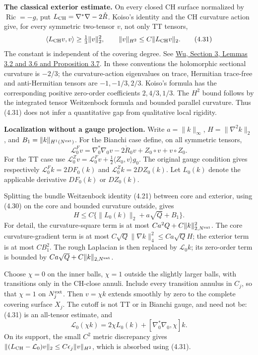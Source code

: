 \documentclass[
  11pt,
]{article}
\begin{document}
\textbf{The classical exterior estimate.} On every closed CH surface
normalized by \(\operatorname{Ric}=-g\), put
\(L_{\rm CH}=\nabla^*\nabla-2\mathring R\). Koiso's identity and the CH
curvature action give, for every symmetric two-tensor \(v\), not only TT
tensors, \[
 \langle L_{\rm CH}v,v\rangle\ge\tfrac13\|v\|_2^2,\qquad
 \|v\|_{H^2}\le C\|L_{\rm CH}v\|_2. \tag{4.31}
\] The constant is independent of the covering degree. See
\href{https://arxiv.org/abs/1106.0511}{Wu, Section 3, Lemmas 3.2 and 3.6
and Proposition 3.7}. In these conventions the holomorphic sectional
curvature is \(-2/3\); the curvature-action eigenvalues on trace,
Hermitian trace-free and anti-Hermitian tensors are \(-1,-1/3,2/3\).
Koiso's formula has the corresponding positive zero-order coefficients
\(2,4/3,1/3\). The \(H^2\) bound follows by the integrated tensor
Weitzenbock formula and bounded parallel curvature. Thus (4.31) does not
infer a quantitative gap from qualitative local rigidity.

\textbf{Localization without a gauge projection.} Write
\(a=\|k\|_\infty\), \(H=\|\nabla^2k\|_2\), and
\(B_1=\|k\|_{H^1(N^{\rm ext})}\). For the Bianchi case define, on all
symmetric tensors, \[
 \mathcal L_0^F v=\nabla_0^*\nabla_0v
          -2\mathring R_0v+Z_0\circ v+v\circ Z_0.
\] For the TT case use
\(\mathcal L_0^Z v=\mathcal L_0^Fv+ \frac12\langle Z_0,v\rangle g_0\).
The original gauge condition gives respectively
\(\mathcal L_0^Fk=2DF_0(k)\) and \(\mathcal L_0^Zk=2DZ_0(k)\). Let
\(L_0(k)\) denote the applicable derivative \(DF_0(k)\) or \(DZ_0(k)\).

Splitting the bundle Weitzenbock identity (4.21) between core and
exterior, using (4.30) on the core and bounded curvature outside, gives
\[
 H\le C\{\|L_0(k)\|_2+a\sqrt Q+B_1\}. \tag{4.32}
\] For detail, the curvature-square term is at most
\(Ca^2Q+C\|k\|_{2,N^{\rm ext}}^2\). The core curvature-gradient term is
at most \(C\sqrt Q\|\nabla k\|_4^2\le Ca\sqrt Q H\); the exterior term
is at most \(C B_1^2\). The rough Laplacian is then replaced by
\(\mathcal L_0k\); its zero-order term is bounded by
\(Ca\sqrt Q+C\|k\|_{2,N^{\rm ext}}\).

Choose \(\chi=0\) on the inner balls, \(\chi=1\) outside the slightly
larger balls, with transitions only in the CH-close annuli. Include
every transition annulus in \(C_j\), so that \(\chi=1\) on
\(N_j^{\rm ext}\). Then \(v=\chi k\) extends smoothly by zero to the
complete covering surface \(X_j\). The cutoff is not TT or in Bianchi
gauge, and need not be: (4.31) is an all-tensor estimate, and \[
 \mathcal L_0(\chi k)=2\chi L_0(k)
                   +[\nabla_0^*\nabla_0,\chi]k. \tag{4.33}
\] On its support, the small \(C^2\) metric discrepancy gives
\(\|(L_{\rm CH}-\mathcal L_0)v\|_2 \le C\epsilon_j\|v\|_{H^2}\), which
is absorbed using (4.31).
\end{document}
